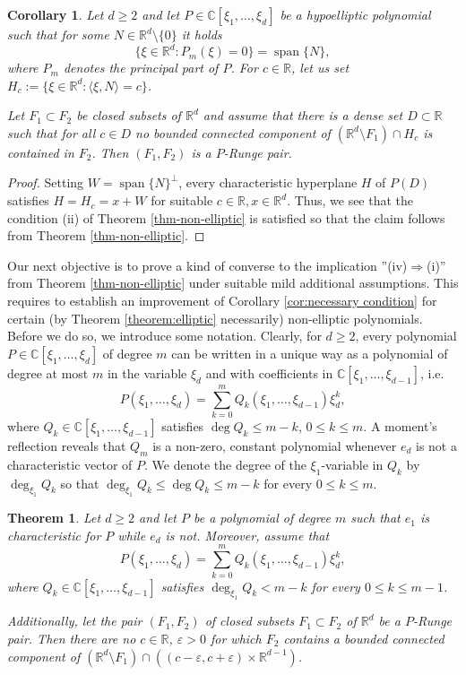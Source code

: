 \documentclass[10pt,leqno]{amsart}
\newtheorem{theorem}[prop]{Theorem}
\newtheorem{corollary}[prop]{Corollary}
\theoremstyle{definition}
\newcommand{\R}{\mathbb R}
\newcommand{\C}{\mathbb C}
\let\epsilon\varepsilon
\begin{document}
\begin{corollary}\label{corollary:sufficient condition for a single characteristic}
	Let $d\geq 2$ and let $P\in\C[\xi_1,\ldots,\xi_d]$ be a hypoelliptic polynomial such that for some $N\in\R^d\setminus\{0\}$ it holds
	$$\{\xi\in\R^d\colon P_m(\xi)=0\}=\operatorname{span}\{N\},$$
	where $P_m$ denotes the principal part of $P$. For $c\in\R$, let us set $H_c:=\{\xi\in\R^d\colon\langle \xi,N\rangle=c\}$.
	
	Let $F_1\subset F_2$ be closed subsets of $\R^d$ and assume that there is a dense set $D\subset\R$ such that for all $c\in D$
	no bounded connected component of $(\R^d\setminus F_1)\cap H_c$ is contained in $F_2$. 
	Then $(F_1,F_2)$ is a $P$-Runge pair.  
\end{corollary}

\begin{proof}
	Setting $W=\operatorname{span}\{N\}^\perp$, every characteristic hyperplane $H$ of $P(D)$ satisfies $H=H_c=x+W$ for suitable $c\in \R, x\in \R^d$. Thus, we see that the condition (ii) of Theorem \ref{thm-non-elliptic} is satisfied so that the claim follows from Theorem \ref{thm-non-elliptic}.
\end{proof}

Our next objective is to prove a kind of converse to the implication ''(iv)$\Rightarrow$(i)'' from Theorem \ref{thm-non-elliptic} under suitable mild additional assumptions. This requires to establish an improvement of Corollary \ref{cor:necessary condition} for certain (by Theorem \ref{theorem:elliptic} necessarily) non-elliptic polynomials. Before we do so, we introduce some notation. Clearly, for $d\geq 2$, every polynomial $P\in \C[\xi_1,\ldots,\xi_d]$ of degree $m$ can be written in a unique way as a polynomial of degree at most $m$ in the variable $\xi_d$ and with coefficients in $\C[\xi_1,\ldots,\xi_{d-1}]$, i.e.\
$$P(\xi_1,\ldots,\xi_d)=\sum_{k=0}^mQ_k(\xi_1,\ldots,\xi_{d-1})\xi_d^k,$$
where $Q_k\in\C[\xi_1,\ldots,\xi_{d-1}]$ satisfies $\operatorname{deg}Q_k\leq m-k$, $0\leq k\leq m$. A moment's reflection reveals that $Q_m$ is a non-zero, constant polynomial whenever $e_d$ is not a characteristic vector of $P$. We denote the degree of the $\xi_1$-variable in $Q_k$ by $\operatorname{deg}_{\xi_1}Q_k$ so that $\operatorname{deg}_{\xi_1}Q_k\leq \operatorname{deg}Q_k\leq m-k$ for every $0\leq k\leq m$. 

\begin{theorem}\label{thm}
	Let $d\geq 2$ and let $P$ be a polynomial of degree $m$ such that $e_1$ is characteristic for $P$ while $e_d$ is not. Moreover, assume that
	$$P(\xi_1,\ldots,\xi_d)=\sum_{k=0}^mQ_k(\xi_1,\ldots,\xi_{d-1})\xi_d^k,$$
	where $Q_k\in\C[\xi_1,\ldots,\xi_{d-1}]$ satisfies $\operatorname{deg}_{\xi_1}Q_k< m-k$ for every $0\leq k\leq m-1$.
	
	Additionally, let the pair $(F_1,F_2)$ of closed subsets $F_1\subset F_2$ of $\R^d$ be a $P$-Runge pair. Then there are no $c\in\R$, $\epsilon>0$ for which $F_2$ contains a bounded connected component of $(\R^d\setminus F_1)\cap (\left(c-\epsilon,c+\epsilon\right)\times\R^{d-1})$. 
\end{theorem}
\end{document}
